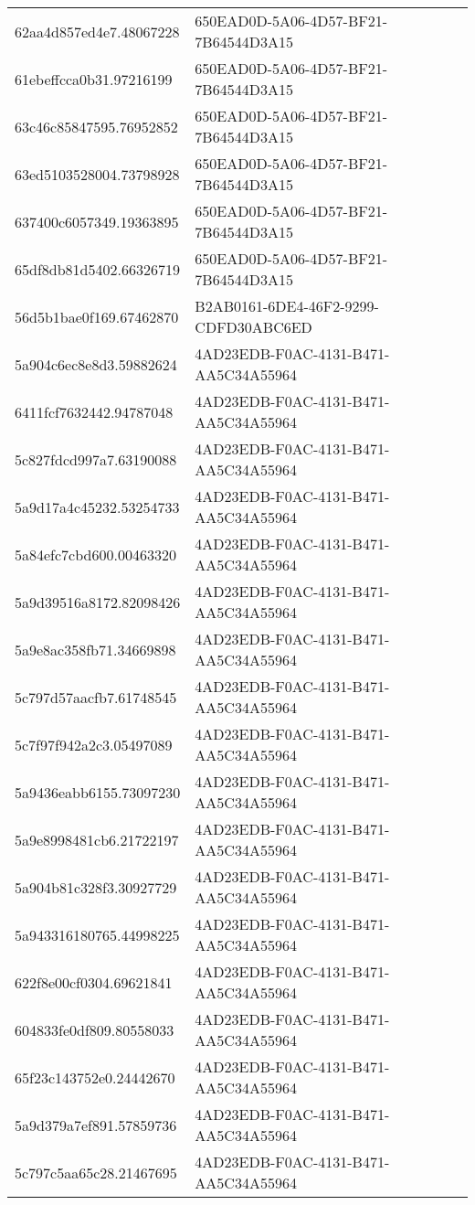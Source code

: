 \begin{tabular}{ll}
62aa4d857ed4e7.48067228 & 650EAD0D-5A06-4D57-BF21-7B64544D3A15 \\
61ebeffcca0b31.97216199 & 650EAD0D-5A06-4D57-BF21-7B64544D3A15 \\
63c46c85847595.76952852 & 650EAD0D-5A06-4D57-BF21-7B64544D3A15 \\
63ed5103528004.73798928 & 650EAD0D-5A06-4D57-BF21-7B64544D3A15 \\
637400c6057349.19363895 & 650EAD0D-5A06-4D57-BF21-7B64544D3A15 \\
65df8db81d5402.66326719 & 650EAD0D-5A06-4D57-BF21-7B64544D3A15 \\
56d5b1bae0f169.67462870 & B2AB0161-6DE4-46F2-9299-CDFD30ABC6ED \\
5a904c6ec8e8d3.59882624 & 4AD23EDB-F0AC-4131-B471-AA5C34A55964 \\
6411fcf7632442.94787048 & 4AD23EDB-F0AC-4131-B471-AA5C34A55964 \\
5c827fdcd997a7.63190088 & 4AD23EDB-F0AC-4131-B471-AA5C34A55964 \\
5a9d17a4c45232.53254733 & 4AD23EDB-F0AC-4131-B471-AA5C34A55964 \\
5a84efc7cbd600.00463320 & 4AD23EDB-F0AC-4131-B471-AA5C34A55964 \\
5a9d39516a8172.82098426 & 4AD23EDB-F0AC-4131-B471-AA5C34A55964 \\
5a9e8ac358fb71.34669898 & 4AD23EDB-F0AC-4131-B471-AA5C34A55964 \\
5c797d57aacfb7.61748545 & 4AD23EDB-F0AC-4131-B471-AA5C34A55964 \\
5c7f97f942a2c3.05497089 & 4AD23EDB-F0AC-4131-B471-AA5C34A55964 \\
5a9436eabb6155.73097230 & 4AD23EDB-F0AC-4131-B471-AA5C34A55964 \\
5a9e8998481cb6.21722197 & 4AD23EDB-F0AC-4131-B471-AA5C34A55964 \\
5a904b81c328f3.30927729 & 4AD23EDB-F0AC-4131-B471-AA5C34A55964 \\
5a943316180765.44998225 & 4AD23EDB-F0AC-4131-B471-AA5C34A55964 \\
622f8e00cf0304.69621841 & 4AD23EDB-F0AC-4131-B471-AA5C34A55964 \\
604833fe0df809.80558033 & 4AD23EDB-F0AC-4131-B471-AA5C34A55964 \\
65f23c143752e0.24442670 & 4AD23EDB-F0AC-4131-B471-AA5C34A55964 \\
5a9d379a7ef891.57859736 & 4AD23EDB-F0AC-4131-B471-AA5C34A55964 \\
5c797c5aa65c28.21467695 & 4AD23EDB-F0AC-4131-B471-AA5C34A55964 \\

\end{tabular}
